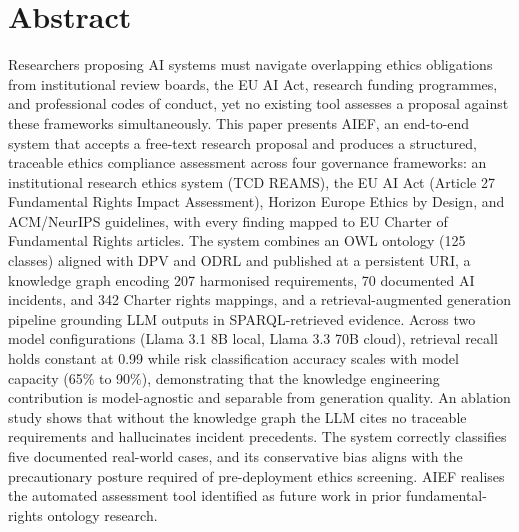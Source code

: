 \documentclass[a4paper,oneside,12pt]{book}
\title{\thesistitle}
\author{\authorname}
\numberwithin{equation}{chapter}
\begin{document}


\chapter*{Abstract}

Researchers proposing AI systems must navigate overlapping ethics obligations from institutional review boards, the EU AI Act, research funding programmes, and professional codes of conduct, yet no existing tool assesses a proposal against these frameworks simultaneously. This paper presents AIEF, an end-to-end system that accepts a free-text research proposal and produces a structured, traceable ethics compliance assessment across four governance frameworks: an institutional research ethics system (TCD REAMS), the EU AI Act (Article 27 Fundamental Rights Impact Assessment), Horizon Europe Ethics by Design, and ACM/NeurIPS guidelines, with every finding mapped to EU Charter of Fundamental Rights articles. The system combines an OWL ontology (125 classes) aligned with DPV and ODRL and published at a persistent URI, a knowledge graph encoding 207 harmonised requirements, 70 documented AI incidents, and 342 Charter rights mappings, and a retrieval-augmented generation pipeline grounding LLM outputs in SPARQL-retrieved evidence. Across two model configurations (Llama 3.1 8B local, Llama 3.3 70B cloud), retrieval recall holds constant at 0.99 while risk classification accuracy scales with model capacity (65\% to 90\%), demonstrating that the knowledge engineering contribution is model-agnostic and separable from generation quality. An ablation study shows that without the knowledge graph the LLM cites no traceable requirements and hallucinates incident precedents. The system correctly classifies five documented real-world cases, and its conservative bias aligns with the precautionary posture required of pre-deployment ethics screening. AIEF realises the automated assessment tool identified as future work in prior fundamental-rights ontology research.

\newpage
\onehalfspacing\raggedright

\tableofcontents
\listoffigures
\listoftables

\mainmatter

\end{document}
